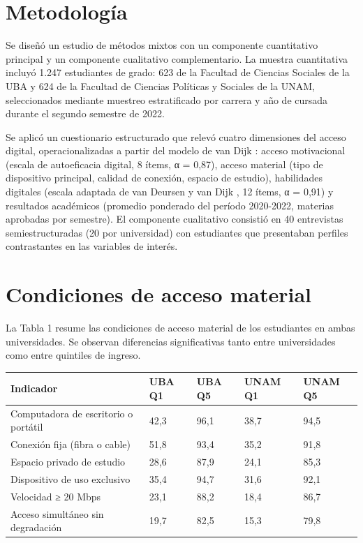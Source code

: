 \section{Metodología}
Se diseñó un estudio de métodos mixtos con un componente cuantitativo principal y un componente cualitativo complementario. La muestra cuantitativa incluyó 1.247 estudiantes de grado: 623 de la Facultad de Ciencias Sociales de la UBA y 624 de la Facultad de Ciencias Políticas y Sociales de la UNAM, seleccionados mediante muestreo estratificado por carrera y año de cursada durante el segundo semestre de 2022.

Se aplicó un cuestionario estructurado que relevó cuatro dimensiones del acceso digital, operacionalizadas a partir del modelo de van Dijk \autocite{2563-VANDIJK2020}: acceso motivacional (escala de autoeficacia digital, 8 ítems, α = 0,87), acceso material (tipo de dispositivo principal, calidad de conexión, espacio de estudio), habilidades digitales (escala adaptada de van Deursen y van Dijk \autocite{2564-VANDEURSEN2019}, 12 ítems, α = 0,91) y resultados académicos (promedio ponderado del período 2020-2022, materias aprobadas por semestre). El componente cualitativo consistió en 40 entrevistas semiestructuradas (20 por universidad) con estudiantes que presentaban perfiles contrastantes en las variables de interés.


\section{Condiciones de acceso material}
La Tabla 1 resume las condiciones de acceso material de los estudiantes en ambas universidades. Se observan diferencias significativas tanto entre universidades como entre quintiles de ingreso.


\begin{table}[!ht]
\centering
{\sf\footnotesize\setlength\tabcolsep{4pt}%
  \begin{tabular}{@{}lllll@{}}
    \toprule
    \textbf{\textbf{Indicador}} & \textbf{\textbf{UBA Q1}} & \textbf{\textbf{UBA Q5}} & \textbf{\textbf{UNAM Q1}} & \textbf{\textbf{UNAM Q5}} \\
    \midrule
    Computadora de escritorio o portátil & 42,3 & 96,1 & 38,7 & 94,5 \\
    \midrule
    Conexión fija (fibra o cable) & 51,8 & 93,4 & 35,2 & 91,8 \\
    \midrule
    Espacio privado de estudio & 28,6 & 87,9 & 24,1 & 85,3 \\
    \midrule
    Dispositivo de uso exclusivo & 35,4 & 94,7 & 31,6 & 92,1 \\
    \midrule
    Velocidad ≥ 20 Mbps & 23,1 & 88,2 & 18,4 & 86,7 \\
    \midrule
    Acceso simultáneo sin degradación & 19,7 & 82,5 & 15,3 & 79,8 \\
    \bottomrule
  \end{tabular}
}%
\label{tbl-1}
\end{table}


